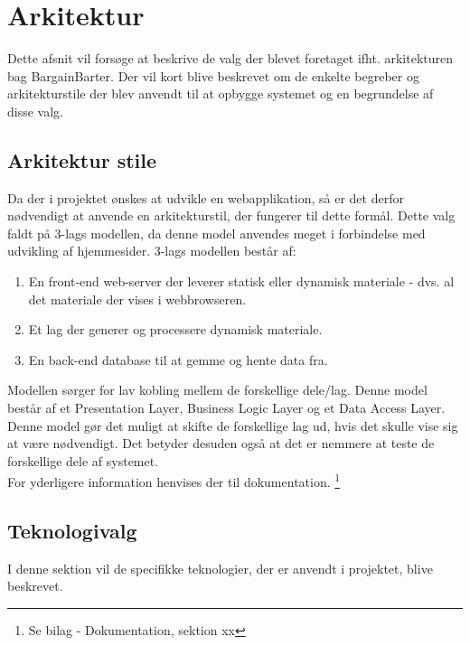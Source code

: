 \chapter{Arkitektur}
Dette afsnit vil forsøge at beskrive de valg der blevet foretaget ifht. arkitekturen bag BargainBarter. Der vil kort blive beskrevet om de enkelte begreber og arkitekturstile der blev anvendt til at opbygge systemet og en begrundelse af disse valg.

\section{Arkitektur stile}
Da der i projektet ønskes at udvikle en webapplikation, så er det derfor nødvendigt at anvende en arkitekturstil, der fungerer til dette formål. 
Dette valg faldt på 3-lags modellen, da denne model anvendes meget i forbindelse med udvikling af hjemmesider. 3-lags modellen består af:
\begin{enumerate}
	\item En front-end web-server der leverer statisk eller dynamisk materiale - dvs. al det materiale der vises i webbrowseren.
	\item Et lag der generer og processere dynamisk materiale.
	\item En back-end database til at gemme og hente data fra.
\end{enumerate}

Modellen sørger for lav kobling mellem de forskellige dele/lag. Denne model består af et Presentation Layer, Business Logic Layer og et Data Access Layer. Denne model gør det muligt at skifte de forskellige lag ud, hvis det skulle vise sig at være nødvendigt. Det betyder desuden også at det er nemmere at teste de forskellige dele af systemet. \\
For yderligere information henvises der til dokumentation. \footnote{Se bilag - Dokumentation, sektion xx}

\section{Teknologivalg}
I denne sektion vil de specifikke teknologier, der er anvendt i projektet, blive beskrevet.


